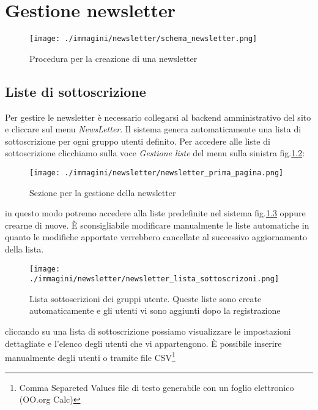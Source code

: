 \chapter{Gestione newsletter}

\begin{figure}[H]
 \centering
 \texttt{[image: ./immagini/newsletter/schema\_newsletter.png]}
 \caption{Procedura per la creazione di una newsletter}
 \label{fig:newsletter_schema}
\end{figure}



\section{Liste di sottoscrizione}

Per gestire le newsletter è necessario collegarsi al backend amministrativo del sito e cliccare sul menu \textsl{NewsLetter}. Il sistema genera automaticamente una lista di sottoscrizione per ogni gruppo utenti definito. Per accedere alle liste di sottoscrizione clicchiamo sulla voce \textsl{Gestione liste} del menu sulla sinistra fig.\ref{fig:newsletter_primapagina}:

\begin{figure}[H]
 \centering
 \texttt{[image: ./immagini/newsletter/newsletter\_prima\_pagina.png]}
 \caption{Sezione per la gestione della newsletter}
 \label{fig:newsletter_primapagina}
\end{figure}

in questo modo potremo accedere alla liste predefinite nel sistema fig.\ref{fig:newsletter_lista_sotto} oppure crearne di nuove. È sconsigliabile modificare manualmente le liste automatiche in quanto le modifiche apportate verrebbero cancellate al successivo aggiornamento della lista.


\begin{figure}[H]
 \centering
 \texttt{[image: ./immagini/newsletter/newsletter\_lista\_sottoscrizoni.png]}
 \caption{Lista sottoscrizioni dei gruppi utente. Queste liste sono create automaticamente e gli utenti vi sono aggiunti dopo la registrazione}
 \label{fig:newsletter_lista_sotto}
\end{figure}

cliccando su una lista di sottoscrizione possiamo visualizzare le impostazioni dettagliate e l'elenco degli utenti che vi appartengono. È possibile inserire manualmente degli utenti o tramite file CSV\footnote{Comma Separeted Values file di testo generabile con un foglio elettronico (OO.org Calc)}

